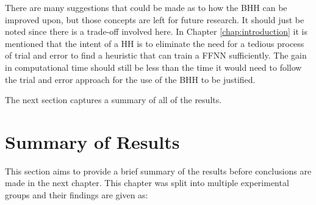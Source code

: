There are many suggestions that could be made as to how the \ac{BHH} can be improved upon, but those concepts are left for future research. It should just be noted since there is a trade-off involved here. In Chapter \ref{chap:introduction} it is mentioned that the intent of a \ac{HH} is to eliminate the need for a tedious process of trial and error to find a heuristic that can train a \ac{FFNN} sufficiently. The gain in computational time should still be less than the time it would need to follow the trial and error approach for the use of the \Ac{BHH} to be justified.

The next section captures a summary of all of the results.

\section{Summary of Results}
\label{sec:results:summary}

This section aims to provide a brief summary of the results before conclusions are made in the next chapter. This chapter was split into multiple experimental groups and their findings are given as:

